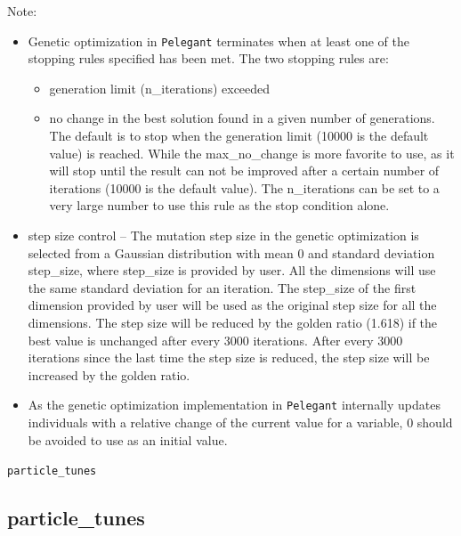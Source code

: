\documentclass[11pt]{article}
\begin{document}
Note:
\begin{itemize}
\item Genetic optimization in {\tt Pelegant} terminates when at least one of the stopping rules specified has been met. 
The two stopping rules are: 

\begin{itemize}
\item generation limit (n\_iterations) exceeded
\item no change in the best solution found in a given number of generations. 
The default is to stop when the generation limit (10000 is the default value) is reached. While the max\_no\_change is more favorite to use, as it will stop until the result can not be improved after a certain number of iterations (10000 is the default value). The n\_iterations can be set 
to a very large number to use this rule as the stop condition alone.
\end{itemize}

\item step size control -- The mutation step size in the genetic optimization is selected from a Gaussian distribution with mean 0 and standard deviation step\_size, where step\_size is provided by user. All the dimensions will use the same standard deviation for an iteration. The step\_size of the first dimension provided by user will be used as the original step size for all the dimensions. The step size will be reduced by the golden ratio (1.618) if the best value is unchanged after every 3000 iterations. After every 3000 iterations since the last time the step size is reduced, the step size will be increased by the golden ratio.

\item As the genetic optimization implementation in {\tt Pelegant} internally updates individuals with a relative change of the current value for a variable, 0 should be avoided to use as an initial value.

\end{itemize}

\newpage
\begin{center}{\Large\verb|particle_tunes|}\end{center}
\subsection{particle\_tunes \label{subsec:particletunes}}
\end{document}
